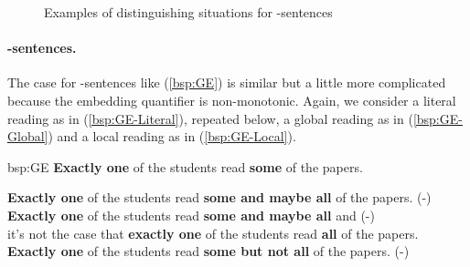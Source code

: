 \documentclass[fleqn,reqno,10pt]{article}
\newcommand{\lit}{\acro{lit}}
\newcommand{\glb}{\acro{glb}}
\newcommand{\loc}{\acro{loc}}
\newcommand{\as}{\acro{as}}
\renewcommand{\es}{\acro{es}}
\renewcommand{\mymark}[1]{\textbf{#1}}
\begin{document}
\begin{figure}[t]
{



}

\caption{Examples of distinguishing situations for \as-sentences}
  \label{fig:AS-distinguishing-pics}
\end{figure}


\paragraph{\es-sentences.}

The case for \es-sentences like (\ref{bsp:GE}) is similar but a
little more complicated because the embedding quantifier is
non-monotonic. Again, we consider a literal reading as in
(\ref{bsp:GE-Literal}), repeated below, a global reading as in
(\ref{bsp:GE-Global}) and a local reading as in (\ref{bsp:GE-Local}).

\begin{exer}{bsp:GE}
\ex \mymark{Exactly one} of the students read {\mymark{some}} of the
  papers.

  \begin{xlist}
  \ex \mymark{Exactly one} of the students read
    {\mymark{some and maybe all}} of the papers. \hfill (\es-\lit)
  \ex 
    \mymark{Exactly one} of the students read \mymark{some and maybe all} 
    and  \hfill (\es-\glb)\\
    it's not the case that \mymark{exactly one} of the students read \mymark{all} of the papers.
  \ex 
    \mymark{Exactly one} of the students read {\mymark{some  but not all}} of the
    papers. \hfill (\es-\loc)
  \end{xlist}
\end{exer}
\end{document}
